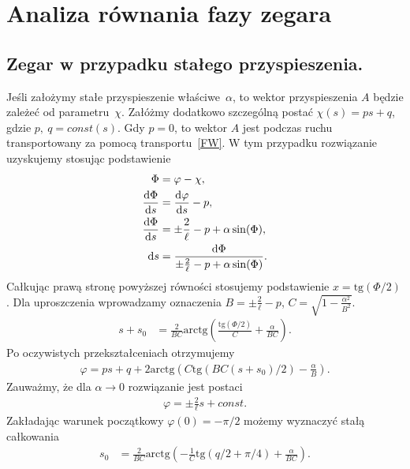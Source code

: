\newpage
\section{Analiza równania fazy zegara}
\subsection{Zegar w przypadku stałego przyspieszenia.}
Jeśli założymy stałe przyspieszenie właściwe~$\alpha$, to wektor 
przyspieszenia $A$ będzie zależeć od parametru~$\chi$.
Załóżmy dodatkowo szczególną postać $\chi (s) = p s + q$, 
gdzie $p,\ q = const(s)$.  Gdy $p=0$, to wektor $A$ jest podczas ruchu
transportowany za pomocą transportu~\eqref{FW}.  
W tym przypadku rozwiązanie uzyskujemy stosując  
podstawienie
\begin{align} \label{analiza_podstawienie1}
\Phi &= \varphi - \chi,\\
\frac{\text{d} \Phi}{\text{d} s} &= \frac{\text{d} \varphi }{\text{d} s} - p,  \nonumber \\
\frac{\text{d} \Phi}{\text{d} s} &= \pm \frac{2}{\ell} - p  + 
\alpha \sin (\Phi ) ,  \nonumber \\
\text{d} s & = \frac{\text{d} \Phi}{ \pm \frac{2}{\ell} - p  + 
\alpha \sin (\Phi ) } . \nonumber
\end{align}
Całkując prawą stronę powyższej równości stosujemy podstawienie
 $ x = \text{tg} (\Phi/2)$. Dla uproszczenia wprowadzamy oznaczenia
$B = \pm \frac{2}{\ell} - p $,
$C =  \sqrt{ 1 - \frac{\alpha^2}{B^2}}$. 
\begin{align*}
s +s_0 & = \frac{2}{BC} \text{arctg}  
\left( \frac{ \text{tg} (\Phi/2)}{C} +\frac{\alpha}{BC} \right).
\end{align*}
Po oczywistych przekształceniach otrzymujemy 
\begin{align*}
\varphi = ps + q + 
2\text{arctg} \left( 
C \text{tg} \left( BC(s + s_0)/2\right)  - \frac{\alpha}{B}
\right) .
\end{align*}
Zauważmy, że dla $\alpha \to 0$ rozwiązanie jest 
postaci
\begin{align}\nonumber
\varphi = \pm \frac{2}{\ell} s + const.
\end{align}
Zakładając warunek początkowy $\varphi(0) = -\pi/2$
 możemy wyznaczyć stałą całkowania
\begin{align*}
s_0 & = \frac{2}{BC} \text{arctg}  
\left( - \frac{1}{C}\text{tg} (q/2 + \pi/4) +\frac{\alpha}{BC} \right).
\end{align*}
